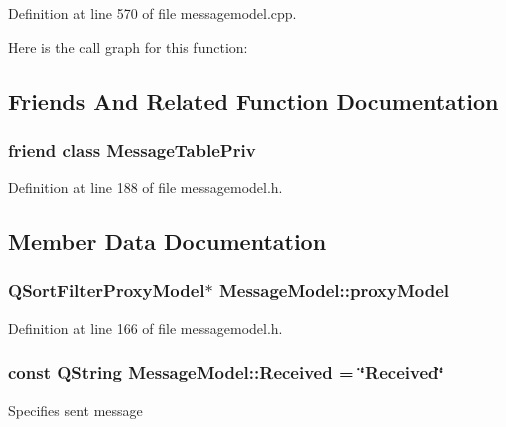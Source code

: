 Definition at line 570 of file messagemodel.\+cpp.



Here is the call graph for this function\+:




\subsection{Friends And Related Function Documentation}
\hypertarget{class_message_model_a5c879241490f0146eae8b49e54d610ac}{}
\subsubsection[{Message\+Table\+Priv}]{\setlength{\rightskip}{0pt plus 5cm}friend class {\bf Message\+Table\+Priv}\hspace{0.3cm}{\ttfamily [friend]}}\label{class_message_model_a5c879241490f0146eae8b49e54d610ac}


Definition at line 188 of file messagemodel.\+h.



\subsection{Member Data Documentation}
\hypertarget{class_message_model_a8248581c9ad7c1f00c4918f4b8b82404}{}
\subsubsection[{proxy\+Model}]{\setlength{\rightskip}{0pt plus 5cm}Q\+Sort\+Filter\+Proxy\+Model$\ast$ Message\+Model\+::proxy\+Model}\label{class_message_model_a8248581c9ad7c1f00c4918f4b8b82404}


Definition at line 166 of file messagemodel.\+h.

\hypertarget{class_message_model_a8539de55f3325f8237617fb50d7f632c}{}
\subsubsection[{Received}]{\setlength{\rightskip}{0pt plus 5cm}const Q\+String Message\+Model\+::\+Received = \char`\"{}Received\char`\"{}\hspace{0.3cm}{\ttfamily [static]}}\label{class_message_model_a8539de55f3325f8237617fb50d7f632c}
Specifies sent message 

